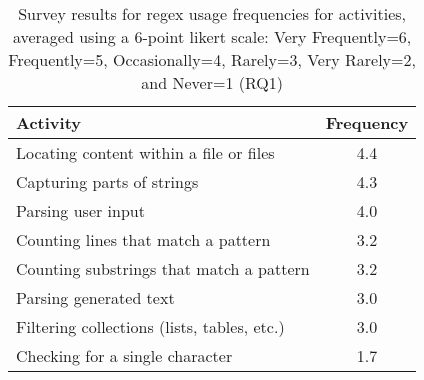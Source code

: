 \begin{table}
\caption{Survey results for regex usage frequencies for  activities, averaged using a 6-point likert scale: Very Frequently=6, Frequently=5, Occasionally=4, Rarely=3, Very Rarely=2, and Never=1 (RQ1)\label{tab:regexactivities}}
\begin{center}
\begin{small}
\begin{tabular}{l|c}
\toprule
\textbf{Activity} & \textbf{Frequency} \\  \midrule \bigstrut
Locating content within a file or files & 4.4\\ \midrule \bigstrut
Capturing parts of strings & 4.3 \\ \midrule \bigstrut
Parsing user input & 4.0\\ \midrule \bigstrut
Counting lines that match a pattern & 3.2\\ \midrule \bigstrut
Counting  substrings that match a pattern & 3.2\\  \midrule \bigstrut
Parsing generated text & 3.0\\  \midrule \bigstrut
Filtering collections (lists, tables, etc.) & 3.0 \\ \midrule \bigstrut
Checking for a single character & 1.7\\
\bottomrule
\end{tabular}
\end{small}
\end{center}
\vspace{-12pt}
\end{table}
